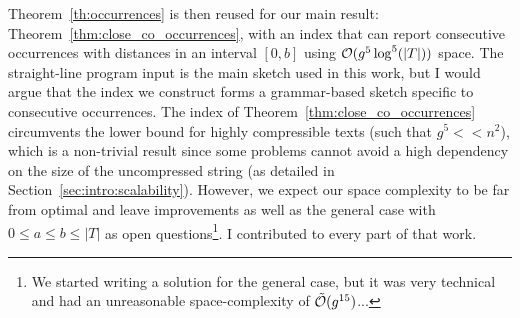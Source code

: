 Theorem~\ref{th:occurrences} is then reused for our main result: Theorem~\ref{thm:close_co_occurrences}, with an index that can report consecutive occurrences with distances in an interval $[0,b]$ using $\mathcal{O} (g^5\log^5(|T|))$ space.
The straight-line program input is the main sketch used in this work, but I would argue that the index we construct forms a grammar-based sketch specific to consecutive occurrences.
The index of Theorem~\ref{thm:close_co_occurrences} circumvents the lower bound for highly compressible texts (such that $g^5 << n^2$), which is a non-trivial result since some problems cannot avoid a high dependency on the size of the uncompressed string (as detailed in Section~\ref{sec:intro:scalability}). However, we expect our space complexity to be far from optimal and leave improvements as well as the general case with $0 \leq a \leq b \leq |T|$ as open questions\footnote{We started writing a solution for the general case, but it was very technical and had an unreasonable space-complexity of $\tilde {\mathcal{O}}(g^{15})$...}. I contributed to every part of that work.

